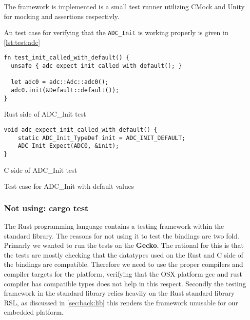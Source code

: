 The framework is implemented is a small test runner utilizing CMock \cite{web:cmock} and Unity \cite{web:unity} for mocking and assertions respectivly.

An test case for verifying that the \texttt{ADC\_Init} is working properly is given in \autoref{lst:test:adc}

\begin{listing}[H]
  \centering
  \begin{minipage}{\textwidth}
  \begin{listing}
    \begin{verbatim}
fn test_init_called_with_default() {
  unsafe { adc_expect_init_called_with_default(); }

  let adc0 = adc::Adc::adc0();
  adc0.init(&Default::default());
}
    \end{verbatim}
    \label{lst:test:adc:rust}
    \caption{Rust side of ADC\_Init test}
  \end{listing}
  \end{minipage}

  \begin{minipage}{\textwidth}
  \begin{listing}
    \begin{verbatim}
void adc_expect_init_called_with_default() {
    static ADC_Init_TypeDef init = ADC_INIT_DEFAULT;
    ADC_Init_Expect(ADC0, &init);
}
    \end{verbatim}
    \label{lst:test:adc:rust}
    \caption{C side of ADC\_Init test}
  \end{listing}
  \end{minipage}

  \caption{Test case for ADC\_Init with default values}
  \label{lst:test:adc}
\end{listing}

\subsubsection{Not using: cargo test}

The Rust programming language contains a testing framework within the standard library.
The reasons for not using it to test the bindings are two fold.
Primarly we wanted to run the tests on the \textbf{Gecko}.
The rational for this is that the tests are mostly checking that the datatypes used on the Rust and C side of the bindings are compatible.
Therefore we need to use the proper compilers and compiler targets for the platform, verifying that the OSX platform gcc and rust compiler has compatible types does not help in this respect.
Secondly the testing framework in the standard library relies heavily on the Rust standard library RSL, as discussed in \autoref{sec:back:lib} this renders the framework unusable for our embedded platform.

